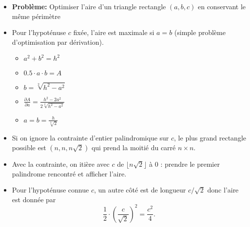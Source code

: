 \begin{frame}
    \frametitle{\problemtitle}
    \begin{itemize}
        \item<+-> \textbf{Problème:} Optimiser l'aire d'un triangle rectangle $(a,b,c)$ en conservant le même périmètre
        \item<+-> Pour l'hypoténuse $c$ fixée, l'aire est maximale si $a=b$ (simple problème d'optimisation par dérivation).
        \begin{itemize}
            \item $a^2 + b^2 = h^2$
            \item $0.5 \cdot a\cdot b = A$
            \item $b = \sqrt[2]{h^2 - a^2}$ 
            \item $\frac{\partial A}{\partial a} = \frac{h^2-2a^2}{2\sqrt[2]{h^2-a^2}}$
            \item $a=b=\frac{h}{\sqrt[2]{2}}$
        \end{itemize}
        \item<+-> Si on ignore la contrainte d'entier palindromique sur $c$, le plus grand rectangle possible est $(n,n,n\sqrt{2})$ qui prend la moitié du carré $n\times n$.
        \item<+-> Avec la contrainte, on itière avec $c$ de $\lfloor n\sqrt{2} \rfloor$ à $0$ : prendre le premier palindrome rencontré et afficher l'aire.
        \item<+-> Pour l'hypoténuse connue $c$, un autre côté est de longueur $c/\sqrt{2}$ donc l'aire est donnée par \[\frac{1}{2}\cdot\left(\frac{c}{\sqrt{2}}\right)^2 = \frac{c^2}{4}.\]

    \end{itemize}
\end{frame}
